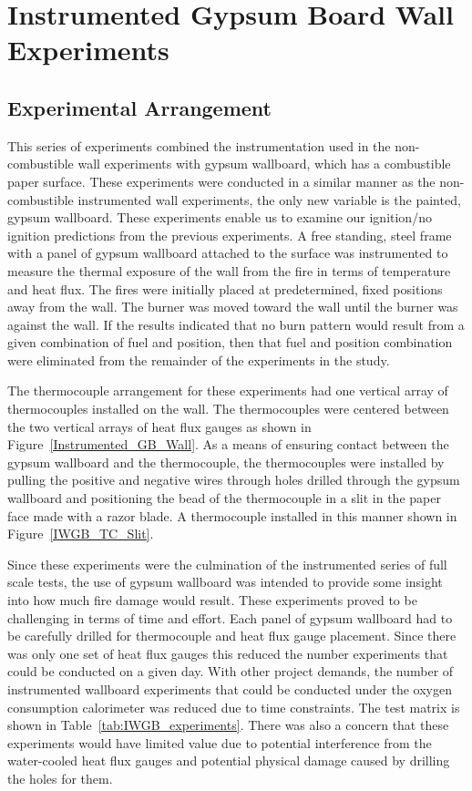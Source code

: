 \documentclass[twoside]{uocthesis}
\begin{document}
{\chapter{Instrumented Gypsum Board Wall Experiments}

\section{Experimental Arrangement}
This series of experiments combined the instrumentation used in the non-combustible wall experiments with gypsum wallboard, which has a combustible paper surface. These experiments were conducted in a similar manner as the non-combustible instrumented wall experiments, the only new variable is the painted, gypsum wallboard. These experiments enable us to examine our ignition/no ignition predictions from the previous experiments.  A free standing, steel frame with a panel of gypsum wallboard attached to the surface was instrumented to measure the thermal exposure of the wall from the fire in terms of temperature and heat flux.  The fires were initially placed at predetermined, fixed positions away from the wall. The burner was moved toward the wall until the burner was against the wall.  If the results indicated that no burn pattern would result from a given combination of fuel and position, then that fuel and position combination were eliminated from the remainder of the experiments in the study.

The thermocouple arrangement for these experiments had one vertical array of thermocouples installed on the wall.  The thermocouples were centered between the two vertical arrays of heat flux gauges as shown in Figure~\ref{Instrumented_GB_Wall}.  As a means of ensuring contact between the gypsum wallboard and the thermocouple, the thermocouples were installed by pulling the positive and negative wires through holes drilled through the gypsum wallboard and positioning the bead of the thermocouple in a slit in the paper face made with a razor blade.  A thermocouple installed in this manner shown in Figure~\ref{IWGB_TC_Slit}.

Since these experiments were the culmination of the instrumented series of full scale tests, the use of gypsum wallboard was intended to provide some insight into how much fire damage would result. These experiments proved to be challenging in terms of time and effort.  Each panel of gypsum wallboard had to be carefully drilled for thermocouple and heat flux gauge placement. Since there was only one set of heat flux gauges this reduced the number experiments that could be conducted on a given day.  With other project demands, the number of instrumented wallboard experiments that could be conducted under the oxygen consumption calorimeter was reduced due to time constraints. The test matrix is shown in Table~\ref{tab:IWGB_experiments}. There was also a concern that these experiments would have limited value due to potential interference from the water-cooled heat flux gauges and potential physical damage caused by drilling the holes for them.

}
\end{document}
